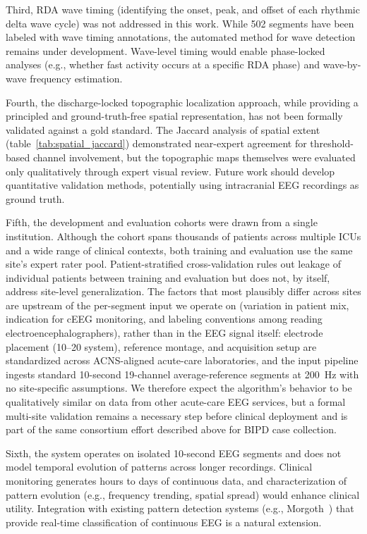 \documentclass{iopjournal}
\begin{document}
Third, RDA wave timing (identifying the onset, peak, and offset of each rhythmic delta wave cycle) was not addressed in this work. While 502 segments have been labeled with wave timing annotations, the automated method for wave detection remains under development. Wave-level timing would enable phase-locked analyses (e.g., whether fast activity occurs at a specific RDA phase) and wave-by-wave frequency estimation.

Fourth, the discharge-locked topographic localization approach, while providing a principled and ground-truth-free spatial representation, has not been formally validated against a gold standard. The Jaccard analysis of spatial extent (table~\ref{tab:spatial_jaccard}) demonstrated near-expert agreement for threshold-based channel involvement, but the topographic maps themselves were evaluated only qualitatively through expert visual review. Future work should develop quantitative validation methods, potentially using intracranial EEG recordings as ground truth.

Fifth, the development and evaluation cohorts were drawn from a single institution. Although the cohort spans thousands of patients across multiple ICUs and a wide range of clinical contexts, both training and evaluation use the same site's expert rater pool. Patient-stratified cross-validation rules out leakage of individual patients between training and evaluation but does not, by itself, address site-level generalization. The factors that most plausibly differ across sites are upstream of the per-segment input we operate on (variation in patient mix, indication for cEEG monitoring, and labeling conventions among reading electroencephalographers), rather than in the EEG signal itself: electrode placement (10--20 system), reference montage, and acquisition setup are standardized across ACNS-aligned acute-care laboratories, and the input pipeline ingests standard 10-second 19-channel average-reference segments at 200~Hz with no site-specific assumptions. We therefore expect the algorithm's behavior to be qualitatively similar on data from other acute-care EEG services, but a formal multi-site validation remains a necessary step before clinical deployment and is part of the same consortium effort described above for BIPD case collection.

Sixth, the system operates on isolated 10-second EEG segments and does not model temporal evolution of patterns across longer recordings. Clinical monitoring generates hours to days of continuous data, and characterization of pattern evolution (e.g., frequency trending, spatial spread) would enhance clinical utility. Integration with existing pattern detection systems (e.g., Morgoth~\cite{jing2023}) that provide real-time classification of continuous EEG is a natural extension.
\end{document}
